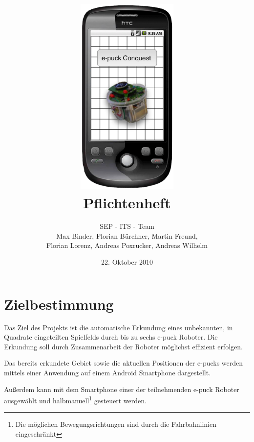 \documentclass[10pt,a4paper]{article}
\title{
	\includegraphics[height=10cm]{images/logo.eps} \\
	\vspace{1cm}
	Pflichtenheft
}
\author{SEP - ITS - Team \\ Max Binder, Florian Bürchner, Martin Freund, \\Florian Lorenz,
											Andreas Poxrucker, Andreas Wilhelm}
\let\oldsection\section
\renewcommand{\section}{\newpage \oldsection}
\begin{document}
	\date{22. Oktober 2010}
	\maketitle
	\newpage
	\tableofcontents	
	\newpage
	
	\section{Zielbestimmung}
		Das Ziel des Projekts ist die automatische Erkundung eines unbekannten, in Quadrate eingeteilten Spielfelds durch bis zu
		sechs e-puck Roboter. Die Erkundung soll durch Zusammenarbeit der Roboter möglichst effizient erfolgen.
		
		Das bereits erkundete Gebiet sowie die aktuellen Positionen der e-pucks werden mittels einer Anwendung auf einem Android
		Smartphone dargestellt.	
		
		Außerdem kann mit dem Smartphone einer der teilnehmenden e-puck Roboter ausgewählt und halbmanuell\footnote{Die
			möglichen Bewegungsrichtungen sind durch die Fahrbahnlinien eingeschränkt}  gesteuert werden.
\end{document}
